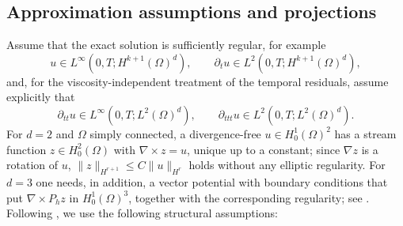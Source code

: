 \documentclass[11pt]{article}
\theoremstyle{remark}\newtheorem{remark}{Remark}
\newcommand{\Ph}{P_h}
\theoremstyle{plain}
\newcommand{\new}[1]{{\color{blue}#1}}
\begin{document}
\subsection{Approximation assumptions and projections}\label{subsec:approx}
Assume that the exact solution is sufficiently regular, for example
\[u\in L^\infty(0,T;H^{k+1}(\Omega)^d),\qquad\partial_tu\in L^2(0,T;H^{k+1}(\Omega)^d),\]
and, for the viscosity-independent treatment of the temporal residuals, assume explicitly that
\[
    \partial_{tt}u\in L^\infty(0,T;L^2(\Omega)^d),\qquad
\partial_{ttt}u\in L^2(0,T;L^2(\Omega)^d).
\]
\new{For $d=2$ and $\Omega$ simply connected, a divergence-free $u\in H^1_0(\Omega)^2$ has a stream function $z\in H^2_0(\Omega)$ with $\nabla\times z=u$, unique up to a constant; since $\nabla z$ is a rotation of $u$, $\|z\|_{H^{r+1}}\le C\|u\|_{H^r}$ holds without any elliptic regularity. For $d=3$ one needs, in addition, a vector potential with boundary conditions that put $\nabla\times\Ph z$ in $H^1_0(\Omega)^3$, together with the corresponding regularity; see \cite{GR86,CM10}.} Following \cite{BBCG24,GAN25}, we use the following structural assumptions:
\end{document}
